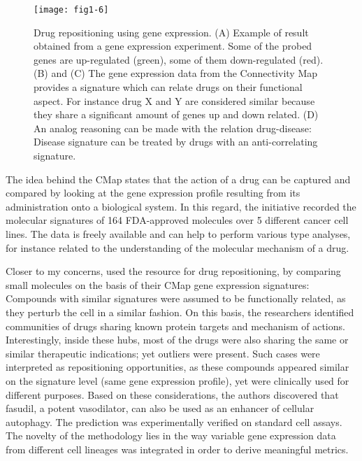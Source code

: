\begin{figure}[ht]
    \centering
    \texttt{[image: fig1-6]}
    \caption{Drug repositioning using gene expression. (A) Example of result obtained from a gene expression experiment. Some of the probed genes are up-regulated (green), some of them down-regulated (red). (B) and (C) The gene expression data from the Connectivity Map provides a signature which can relate drugs on their functional aspect. For instance drug X and Y are considered similar because they share a significant amount of genes up and down related. (D) An analog reasoning can be made with the relation drug-disease: Disease signature can be treated by drugs with an anti-correlating signature.}
    \label{fig1-6}
\end{figure}


The idea behind the CMap states that the action of a drug can be captured and compared by looking at the gene expression profile resulting from its administration onto a biological system. In this regard, the initiative recorded the molecular signatures of 164 FDA-approved molecules over 5 different cancer cell lines. The data is freely available and can help to perform various type analyses, for instance related to the understanding of the molecular mechanism of a drug.

Closer to my concerns, \citep{iorio2010discovery} used the resource for drug repositioning, by comparing small molecules on the basis of their CMap gene expression signatures: Compounds with similar signatures were assumed to be functionally related, as they perturb the cell in a similar fashion. On this basis, the researchers identified communities of drugs sharing known protein targets and mechanism of actions. Interestingly, inside these hubs, most of the drugs were also sharing the same or similar therapeutic indications; yet outliers were present. Such cases were interpreted as repositioning opportunities, as these compounds appeared similar on the signature level (same gene expression profile), yet were clinically used for different purposes. Based on these considerations, the authors discovered that fasudil, a potent vasodilator, can also be used as an enhancer of cellular autophagy. The prediction was experimentally verified on standard cell assays. The novelty of the methodology lies in the way variable gene expression data from different cell lineages was integrated in order to derive meaningful metrics.

